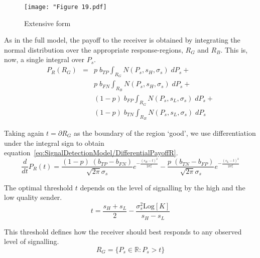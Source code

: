 \documentclass[a4paper,12pt]{article}
\numberwithin{equation}{section}
\begin{document}
\begin{figure}[h]
\begin{center}
\leavevmode
\texttt{[image: "Figure 19.pdf]}
\caption{Extensive form}
\label{fig:Figure 19.pdf}
\end{center}
\end{figure}

\newpage

As in the full model, the payoff to the receiver is obtained by integrating the normal distribution over the appropriate response-regions, $R_{G}$ and $R_{B}$. This is, now, a single integral over $P_{s}$.
\begin{equation}
\label{eq:SignalDetectionModel/PayoffR}
\begin{array}{rcl}
P_{R}(R_{G}) &=& p \; b_{TP} \displaystyle \int_{R_{G}} N(P_{s}, s_{H}, \sigma_{s}) \; dP_{s} +\\
&&p \; b_{FN} \displaystyle \int_{R_{B}} N(P_{s}, s_{H}, \sigma_{s}) \; dP_{s} +\\
&&(1-p) \; b_{FP} \displaystyle \int_{R_{G}} N(P_{s}, s_{L}, \sigma_{s}) \; dP_{s} +\\
&&(1-p) \; b_{TN} \displaystyle \int_{R_{B}} N(P_{s}, s_{L}, \sigma_{s}) \; dP_{s}
\end{array}
\end{equation}

Taking again $t=\partial R_{G}$ as the boundary of the region `good', we use differentiation under the integral sign to obtain equation~\ref{eq:SignalDetectionModel/DifferentialPayoffR}.
\begin{equation}
\label{eq:SignalDetectionModel/DifferentialPayoffR}
\frac{d}{dt}P_{R}(t)= \frac{(1-p) \; (b_{TP}-b_{FN})}{\sqrt{2 \pi} \sigma_{s}} e^{-\frac{(s_{H}-t)^2}{2 \sigma_{s}^2}} - \frac{p \; (b_{TN}-b_{FP})}{\sqrt{2 \pi} \sigma_{s}} e^{-\frac{(s_{L}-t)^2}{2 \sigma_{s}^2}}
\end{equation}

The optimal threshold $t$ depends on the level of signalling by the high and the low quality sender.
\begin{equation}
\label{eq:SignalDetectionModel/Threshold}
t=\frac{s_{H}+s_{L}}{2}-\frac{\sigma_{s}^2 \text{Log}[K]}{s_{H}-s_{L}}
\end{equation}

This threshold defines how the receiver should best responds to any observed level of signalling.
\begin{equation}
\label{eq:SignalDetectionModel/RG}
R_{G} = \{P_{s} \in \mathbb{R} : P_{s}>t\}
\end{equation}
\end{document}

